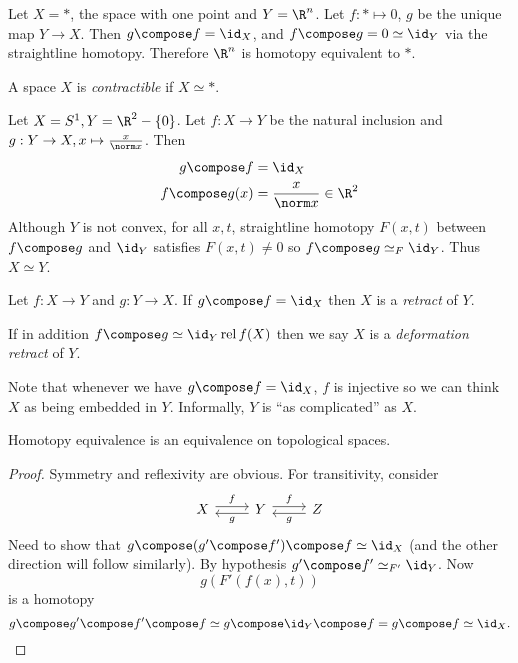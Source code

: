 \documentclass[a4paper]{article}
\DeclareMathOperator{\rel}{rel}
\begin{document}
\begin{eg}
  Let \(X = *\), the space with one point and \(Y = \R^n\). Let \(f: * \mapsto 0\), \(g\) be the unique map \(Y \to X\). Then \(g \compose f = \id_X\), and \(f \compose g = 0 \simeq \id_Y\) via the straightline homotopy. Therefore \(\R^n\) is homotopy equivalent to \(*\).
\end{eg}

\begin{definition}[contractible]
  A space \(X\) is \emph{contractible} if \(X \simeq *\).
\end{definition}

\begin{eg}
  Let \(X = S^1, Y = \R^2 - \{0\}\). Let \(f: X \to Y\) be the natural inclusion and \(g: Y \to X, x \mapsto \frac{x}{\norm x}\). Then
  \begin{align*}
    g \compose f &= \id_X \\
    f \compose g(x) &= \frac{x}{\norm x} \in \R^2
  \end{align*}
  Although \(Y\) is not convex, for all \(x, t\), straightline homotopy \(F(x, t)\) between \(f \compose g\) and \(\id_Y\) satisfies \(F(x, t) \neq 0\) so \(f \compose g \simeq_F \id_Y\). Thus \(X \simeq Y\).
\end{eg}

\begin{definition}
  Let \(f: X \to Y\) and \(g: Y \to X\). If \(g \compose f = \id_X\) then \(X\) is a \emph{retract} of \(Y\).

  If in addition \(f \compose g \simeq \id_Y \rel f(X)\) then we say \(X\) is a \emph{deformation retract} of \(Y\).
\end{definition}

Note that whenever we have \(g \compose f = \id_X\), \(f\) is injective so we can think \(X\) as being embedded in \(Y\). Informally, \(Y\) is ``as complicated'' as \(X\).

\begin{lemma}
  Homotopy equivalence is an equivalence on topological spaces.
\end{lemma}

\begin{proof}
  Symmetry and reflexivity are obvious. For transitivity, consider
  \[
    \begin{tikzcd}
      X \ar[r, "f", shift left] & Y \ar[l, "g", shift left] \ar[r, "f", shift left] & Z \ar[l, "g", shift left]
    \end{tikzcd}
  \]
  Need to show that \(g \compose (g' \compose f') \compose f \simeq \id_X\) (and the other direction will follow similarly). By hypothesis \(g' \compose f' \simeq_{F'} \id_Y\). Now
  \[
    g(F'(f(x), t))
  \]
  is a homotopy
  \[
    g \compose g' \compose f' \compose f \simeq g \compose \id_Y \compose f = g \compose f \simeq \id_X.
  \]
\end{proof}
\end{document}
